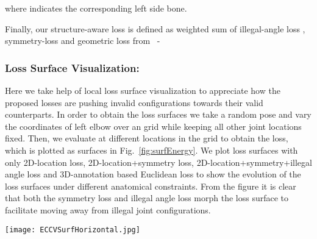 \documentclass[runningheads]{llncs}
\begin{document}
where  indicates the corresponding left side bone.

Finally, our structure-aware loss  is defined as weighted sum of illegal-angle loss , symmetry-loss  and geometric loss  from~\cite{Zhou_2017_ICCV} - 

\vspace{-3em}

\subsubsection{Loss Surface Visualization:} Here we take help of local loss surface visualization to appreciate how the proposed losses are pushing invalid configurations towards their valid counterparts. In order to obtain the loss surfaces we take a random pose  and vary the  coordinates of left elbow over an  grid while keeping all other joint locations fixed. Then, we evaluate  at different  locations in the  grid to obtain the loss, which is plotted as surfaces in Fig.~\ref{fig:surfEnergy}. We plot loss surfaces with only 2D-location loss, 2D-location+symmetry loss, 2D-location+symmetry+illegal angle loss and 3D-annotation based Euclidean loss to show the evolution of the loss surfaces under different anatomical constraints. From the figure it is clear that both the symmetry loss and illegal angle loss morph the loss surface to facilitate moving away from illegal joint configurations.

\begin{figure*}[!h] 
	\centering
	\texttt{[image: ECCVSurfHorizontal.jpg]}
    \caption{\textbf{Loss Surface Evolution} Plots (a) to (d) show the local loss surfaces for (a) 2D-location loss. (b) 2D-location+symmetry loss (c) 2D-location+symmetry+illegal angle loss and (d) full 3D-annotation Euclidean loss. The points (1), (2) and (3) highlighted on the plots are the corresponding 3D poses shown in (f), (g) and (h), with (3) being the ground-truth depth. The illegal angle penalty increases the loss for pose (1), which has the elbow bent backwards. Pose (2) has a legal joint angle, but the symmetry is lost. Pose (3) is correct. We can see that without the angle loss, the loss at (1) and (3) are equal and we cannot discern between the two points.} 
    \vspace{-1em}
    \label{fig:surfEnergy}
\end{figure*}
\vspace{-2em}
\end{document}
